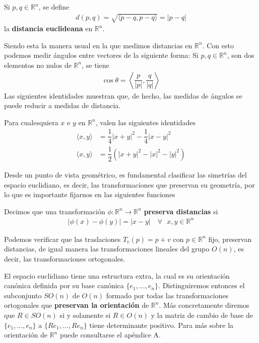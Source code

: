 \documentclass[oneside,11pt]{memoir}
\begin{document}
\begin{definition}\label{metrica}
Si $p,q\in \mathbb{R}^n$, se define
\begin{align*}
    d(p,q)  =\sqrt{\langle p-q,p-q \rangle}=|p-q|
\end{align*}
la \textbf{distancia euclideana} en $\mathbb{R}^n$.
\end{definition}
Siendo esta la manera usual en la que medimos distancias en $\mathbb{R}^n$. Con esto podemos medir ángulos entre vectores de la siguiente forma: Si $p,q\in \mathbb{R}^n$, son dos elementos no nulos de $\mathbb{R}^n$, se tiene
\begin{align*}
    \cos \theta =\left\langle \dfrac{p}{|p|},\dfrac{q}{|q|}\right\rangle
\end{align*}
 Las siguientes identidades muestran que, de hecho, las medidas de ángulos se puede reducir a medidas de distancia.
\begin{proposition}
    Para cualesquiera $x$ e $y$ en $\mathbb{R}^n$, valen las siguientes identidades
    \begin{align*}
        \langle x,y \rangle&= \dfrac{1}{4}|x+y|^2-\dfrac{1}{4}|x-y|^2\\
        \langle x,y \rangle&= \dfrac{1}{2}\left(|x+y|^2-|x|^2-|y|^2\right)
    \end{align*}
\end{proposition}
Desde un punto de vista geométrico, es fundamental clasificar las simetrías del espacio euclidiano,
es decir, las transformaciones que preservan su geometría, por lo que es importante fijarnos en las siguientes funciones
\begin{definition}
    Decimos que una transformación $\phi:\mathbb{R}^n\to \mathbb{R}^n$ \textbf{preserva distancias} si    
    \begin{align*}
        |\phi(x)-\phi(y)|=|x-y| \quad \forall\text{ } x,y\in \mathbb{R}^n
    \end{align*}
\end{definition}
Podemos verificar que las traslaciones $T_v(p)=p+v$ con $p\in \mathbb{R}^n$ fijo, preservan distancias, de igual manera las transformaciones lineales del grupo $O(n)$, es decir, las transformaciones ortogonales.

El espacio euclidiano tiene una estructura extra, la cual es su orientación canónica definida por su base canónica $\{e_1,\ldots, e_n\}$. Distinguiremos entonces el subconjunto $SO(n)$ de $O(n)$ formado por todas las transformaciones ortogonales que \textbf{preservan la orientación} de $\mathbb{R}^n$. Más concretamente diremos que $R\in SO(n)$ si y solamente si $R\in O(n)$ y la matriz de cambio de base de $\{e_1,\ldots, e_n\}$ a $\{Re_1,\ldots, Re_n\}$ tiene determinante positivo. Para más sobre la orientación de $\mathbb{R}^n$ puede consultarse el apéndice A.\\
\end{document}
